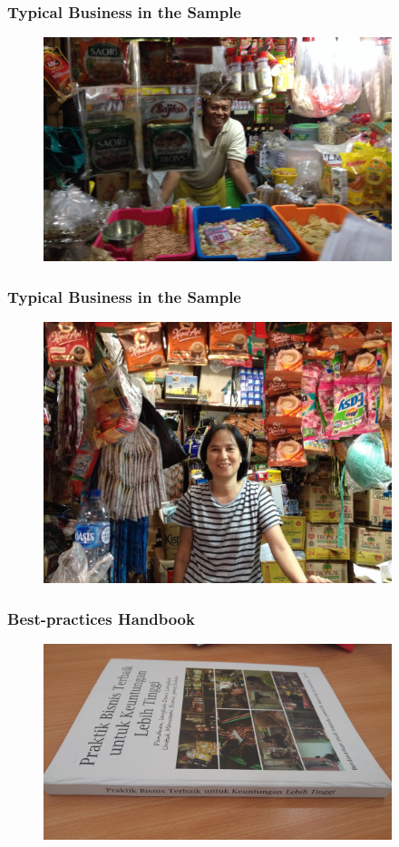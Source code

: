 \documentclass[hideothersubsections, usenames,dvipsnames,10pt]{beamer}
\begin{document}
\begin{frame}
\frametitle{Typical Business in the Sample}

\begin{figure}[htbp]
	\centering
		\includegraphics[width=4in]{pics/retailer1.jpg}
	\label{height}
\end{figure}
\end{frame}

\begin{frame}
\frametitle{Typical Business in the Sample}

\begin{figure}[htbp]
	\centering
		\includegraphics[width=4in]{pics/retailer2.jpg}
	\label{height}
\end{figure}
\end{frame}


\begin{frame}
\frametitle{Best-practices Handbook}

\begin{figure}[htbp]
	\centering
		\includegraphics[width=4in]{pics/handbook.jpg}
	
	\label{height}
\end{figure}
\end{frame}
\end{document}
